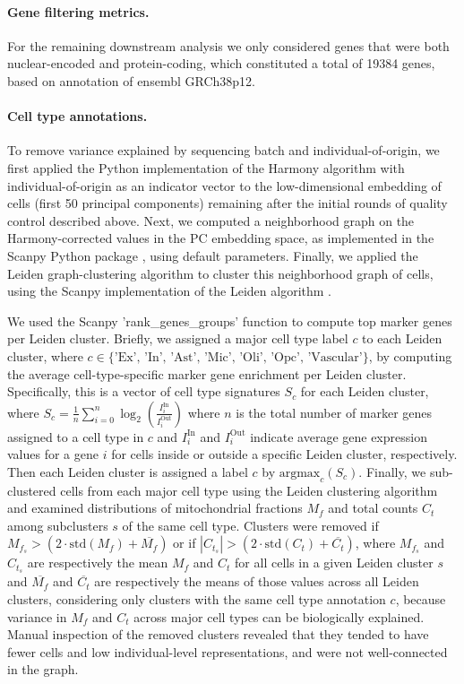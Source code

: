 \paragraph{Gene filtering metrics.}
For the remaining downstream analysis we only considered genes that were both nuclear-encoded and protein-coding, which constituted a total of 19384 genes, based on annotation of ensembl GRCh38p12. 

\paragraph{Cell type annotations.}
To remove variance explained by sequencing batch and individual-of-origin, we first applied the Python implementation of the Harmony algorithm \cite{Korsunsky2019-qz} with individual-of-origin as an indicator vector to the low-dimensional embedding of cells (first 50 principal components) remaining after the initial rounds of quality control described above. Next, we computed a neighborhood graph on the Harmony-corrected values in the PC embedding space, as implemented in the Scanpy Python package \cite{Wolf2018-jx}, using default parameters. Finally, we applied the Leiden graph-clustering algorithm to cluster this neighborhood graph of cells, using the Scanpy implementation of the Leiden algorithm \cite{Traag2019-xu}.

We used the Scanpy 'rank\_genes\_groups' function to compute top marker genes per Leiden cluster. Briefly, we assigned a major cell type label $ c $ to each Leiden cluster, where $ c \in \{\text{'Ex', 'In', 'Ast', 'Mic', 'Oli', 'Opc', 'Vascular'}\} $, by computing the average cell-type-specific marker gene enrichment per Leiden cluster. Specifically, this is a vector of cell type signatures $ S_c $ for each Leiden cluster, where 
$ S_c = \frac{1}{n} \sum_{i=0}^{n} \log_2\left(\frac{I_i^{\text{In}}}{I_i^{\text{Out}}}\right) $
where $ n $ is the total number of marker genes assigned to a cell type in $ c $ and $ I_i^{\text{In}} $ and $ I_i^{\text{Out}} $ indicate average gene expression values for a gene $ i $ for cells inside or outside a specific Leiden cluster, respectively. Then each Leiden cluster is assigned a label $ c $ by 
$ \text{argmax}_c(S_c) $.
Finally, we sub-clustered cells from each major cell type using the Leiden clustering algorithm and examined distributions of mitochondrial fractions $ M_f $ and total counts $ C_t $ among subclusters $ s $ of the same cell type. Clusters were removed if 
$ M_{f_s} > (2 \cdot \text{std}(M_f) + \overline{M_f}) $ 
or if 
$ |C_{t_s}| > (2 \cdot \text{std}(C_t) + \overline{C_t}) $, 
where $ M_{f_s} $ and $ C_{t_s} $ are respectively the mean $ M_f $ and $ C_t $ for all cells in a given Leiden cluster $ s $ and $ \overline{M_f} $ and $ \overline{C_t} $ are respectively the means of those values across all Leiden clusters, considering only clusters with the same cell type annotation $ c $, because variance in $ M_f $ and $ C_t $ across major cell types can be biologically explained. Manual inspection of the removed clusters revealed that they tended to have fewer cells and low individual-level representations, and were not well-connected in the graph.

